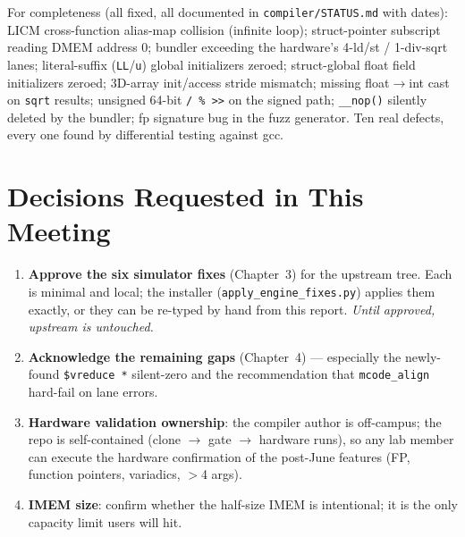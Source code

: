 \documentclass[11pt,a4paper]{report}
\begin{document}
For completeness (all fixed, all documented in
\texttt{compiler/STATUS.md} with dates): LICM cross-function alias-map
collision (infinite loop); struct-pointer subscript reading DMEM address 0;
bundler exceeding the hardware's 4-ld/st / 1-div-sqrt lanes; literal-suffix
(\texttt{LL}/\texttt{u}) global initializers zeroed; struct-global float
field initializers zeroed; 3D-array init/access stride mismatch; missing
float$\to$int cast on \texttt{sqrt} results; unsigned 64-bit
\texttt{/ \% >>} on the signed path; \texttt{\_\_nop()} silently deleted
by the bundler; fp signature bug in the fuzz generator. Ten real defects,
every one found by differential testing against gcc.

\chapter{Decisions Requested in This Meeting}

\begin{enumerate}[itemsep=4pt]
  \item \textbf{Approve the six simulator fixes} (Chapter~3) for the
        upstream tree. Each is minimal and local; the installer
        (\texttt{apply\_engine\_fixes.py}) applies them exactly, or they can
        be re-typed by hand from this report. \emph{Until approved, upstream
        is untouched.}
  \item \textbf{Acknowledge the remaining gaps} (Chapter~4) --- especially
        the newly-found \texttt{\$vreduce *} silent-zero and the
        recommendation that \texttt{mcode\_align} hard-fail on lane errors.
  \item \textbf{Hardware validation ownership}: the compiler author is
        off-campus; the repo is self-contained (clone $\to$ gate $\to$
        hardware runs), so any lab member can execute the hardware
        confirmation of the post-June features (FP, function pointers,
        variadics, $>$4 args).
  \item \textbf{IMEM size}: confirm whether the half-size IMEM is
        intentional; it is the only capacity limit users will hit.
\end{enumerate}
\end{document}
